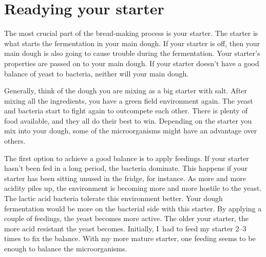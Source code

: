 \section{Readying your starter}%
\label{sec:readying-starter}

The most crucial part of the bread-making process is your starter.
The starter is what starts the fermentation in your main dough.
If your starter is off, then your main dough is also going
to cause trouble during the fermentation. Your starter's
properties are passed on to your main dough. If your starter
doesn't have a good balance of yeast to bacteria, neither will your
main dough.

\begin{flowchart}[!htb]
\centering
  
  \caption[Process to prepare your starter before baking]{The process to check
      your sourdough starter when making wheat-based doughs. In practice
      I~frequently use a stiff sourdough starter. The stiff starter features
      enhanced yeast activity. In that case, you can use the same ratios as
      shown in the chart except for the water quantity. The stiff starter has
      a hydration of \qtyrange{50}{60}{\percent}. So you would have half the
      shown water quantities, i.e., if the chart shows \qty{100}{\gram} of
      water, use \qtyrange{50}{60}{\gram} of water for your stiff starter.}%
  \label{fig:process-starter-wheat-sourdough}
\end{flowchart}

Generally, think of the dough you are mixing as a big starter with salt.
After mixing all the ingredients, you have a green field environment again.
The yeast and bacteria start to fight again to outcompete each other.
There is plenty of food available, and they all do their best to win.
Depending on the starter you mix into your dough, some of the microorganisms
might have an advantage over others.

The first option to achieve a good balance is to apply feedings.
If your starter hasn't been fed in a long period, the
bacteria dominate. This happens if your starter has been
sitting unused in the fridge, for instance. As more and more
acidity piles up, the environment is becoming more and more hostile
to the yeast. The lactic acid bacteria tolerate this environment
better. Your dough fermentation would be more on the
bacterial side with this starter. By applying a couple of
feedings, the yeast becomes more active. The older your
starter, the more acid resistant the yeast becomes. Initially,
I~had to feed my starter 2--3 times to fix the balance. With my
more mature starter, one feeding seems to be enough to balance
the microorganisms.

